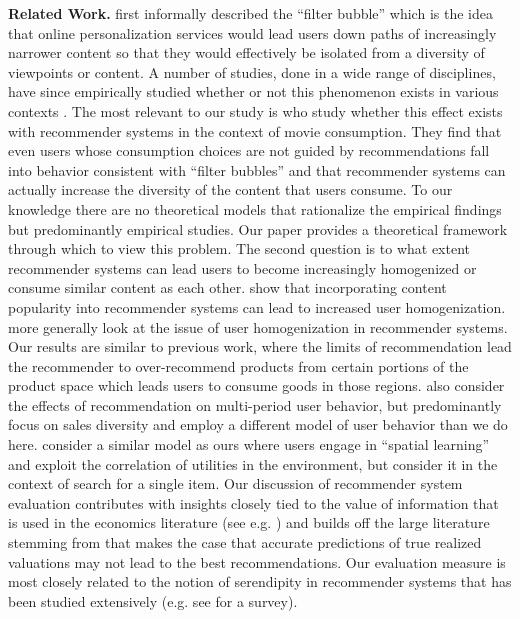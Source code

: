 \documentclass[sigconf]{acmart}
\begin{document}
\textbf{Related Work.} 
\cite{pariser2011filter} first informally described the ``filter bubble'' which is the idea that online personalization services would lead users down paths of increasingly narrower content so that they would effectively be isolated from a diversity of viewpoints or content. A number of studies, done in a wide range of disciplines, have since empirically studied whether or not this phenomenon exists in various contexts \cite{flaxman2016filter,hosanagar2013will,moller2018blame,nguyen2014exploring}. The most relevant to our study is \cite{nguyen2014exploring} who study whether this effect exists with recommender systems in the context of movie consumption. They find that even users whose consumption choices are not guided by recommendations fall into behavior consistent with ``filter bubbles'' and that recommender systems can actually increase the diversity of the content that users consume. To our knowledge there are no theoretical models that rationalize the empirical findings but predominantly empirical studies. Our paper provides a theoretical framework through which to view this problem.
The second question is to what extent recommender systems can lead users to become increasingly homogenized or consume similar content as each other. \cite{celam2008hits,treviranus2009value} show that incorporating content popularity into recommender systems can lead to increased user homogenization. \cite{chaney2018algorithmic} more generally look at the issue of user homogenization in recommender systems. Our results are similar to previous work, where the limits of recommendation lead the recommender to over-recommend products from certain portions of the product space which leads users to consume goods in those regions.
\cite{fleder2009blockbuster} also consider the effects of recommendation on multi-period user behavior, but predominantly focus on sales diversity and employ a different model of user behavior than we do here. \cite{hodgson2019horse} consider a similar model as ours where users engage in ``spatial learning'' and exploit the correlation of utilities in the environment, but consider it in the context of search for a single item.
Our discussion of recommender system evaluation contributes with insights closely tied to the value of information that is used in the economics literature (see e.g. \cite{bergemann2019information}) and builds off the large literature stemming from \cite{mcnee2006being} that makes the case that accurate predictions of true realized valuations may not lead to the best recommendations. Our evaluation measure is most closely related to the notion of serendipity in recommender systems that has been studied extensively (e.g. see \cite{kotkov2016survey} for a survey).
\end{document}
